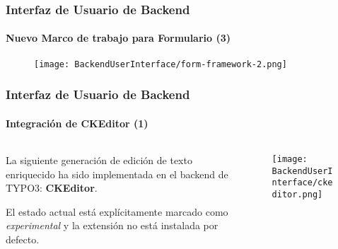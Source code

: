 \begin{frame}[fragile]
	\frametitle{Interfaz de Usuario de Backend}
	\framesubtitle{Nuevo Marco de trabajo para Formulario (3)}

	\begin{figure}
		\texttt{[image: BackendUserInterface/form-framework-2.png]}
	\end{figure}

\end{frame}


\begin{frame}[fragile]
	\frametitle{Interfaz de Usuario de Backend}
	\framesubtitle{Integración de CKEditor (1)}

	\begin{columns}[T]
		\begin{column}{.5\textwidth}
			La siguiente generación de edición de texto enriquecido ha sido implementada en el backend de TYPO3:
			\textbf{CKEditor}.\newline

			El estado actual está explícitamente marcado como \textit{experimental} y la extensión
			no está instalada por defecto.\newline
		\end{column}
		\begin{column}{.5\textwidth}
			\begin{figure}\vspace*{-0.4cm}
				\texttt{[image: BackendUserInterface/ckeditor.png]}
			\end{figure}
		\end{column}
	\end{columns}

\end{frame}



